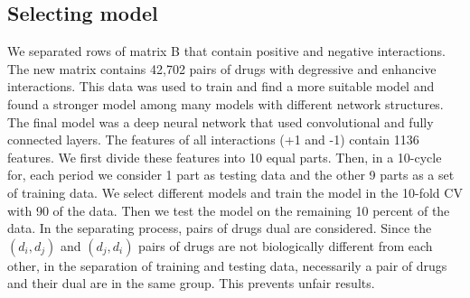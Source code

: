 \documentclass{bmcart}
\begin{document}
\subsection*{Selecting model
\label{Selecting model}}
We separated rows of matrix B that contain positive and negative interactions. The new matrix contains 42,702 pairs of drugs with degressive and enhancive interactions. This data was used to train and find a more suitable model and found a stronger model among many models with different network structures. The final model was a deep neural network that used convolutional and fully connected layers. The features of all interactions (+1 and -1) contain 1136 features. We first divide these features into 10 equal parts. Then, in a 10-cycle for, each period we consider 1 part as testing data and the other 9 parts as a set of training data. We select different models and train the model in the 10-fold CV with 90  of the data. Then we test the model on the remaining 10 percent of the data. In the separating process, pairs of drugs dual are considered. Since the $ (d_i, d_j) $ and $ (d_j, d_i) $ pairs of drugs are not biologically different from each other, in the separation of training and testing data, necessarily a pair of drugs and their dual are in the same group. This prevents unfair results.
\end{document}
